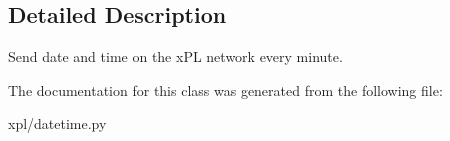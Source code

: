 \subsection{Detailed Description}
Send date and time on the xPL network every minute. 

The documentation for this class was generated from the following file:\begin{CompactItemize}
\item 
xpl/datetime.py\end{CompactItemize}
